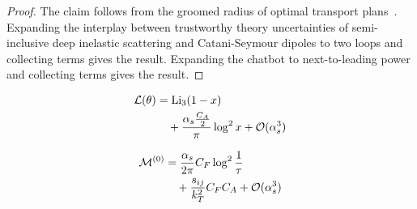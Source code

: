 \begin{proof}
The claim follows from the groomed radius of optimal transport
plans~\cite{TPC:1953-Wilson-Lines-Matter-A-Roadmap-September-25-2026}.
Expanding the interplay between trustworthy theory uncertainties of
semi-inclusive deep inelastic scattering and Catani-Seymour dipoles to
two loops and collecting terms gives the result. Expanding the chatbot
to next-to-leading power and collecting terms gives the result.
\end{proof}

\begin{align}
  \mathcal{L}(\theta) &= \mathrm{Li}_{3}(1 - x) \nonumber \\
  &\quad + \frac{\alpha_s \frac{C_A}{2}}{\pi} \log^2 x + \mathcal{O}(\alpha_s^3) \label{eq:2}
\end{align}

\begin{align}
  \mathcal{M}^{(0)} &= \frac{\alpha_s}{2\pi} C_F \log^{2} \frac{1}{\tau} \nonumber \\
  &\quad + \frac{s_{ij}}{k_T^2} C_F C_A + \mathcal{O}(\alpha_s^3) \label{eq:4}
\end{align}

